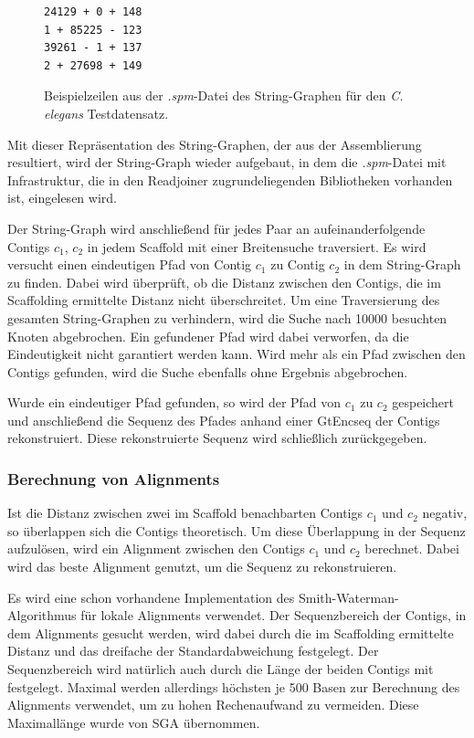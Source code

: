 \documentclass[a4paper,10pt,parskip]{scrartcl}
\begin{document}
\begin{figure}
  \centering
\begin{verbatim}
24129 + 0 + 148
1 + 85225 - 123
39261 - 1 + 137
2 + 27698 + 149
\end{verbatim}
\caption{\label{abb: spm}Beispielzeilen aus der \textit{.spm}-Datei des
  String-Graphen für den \textit{C. elegans} Testdatensatz.}
\end{figure}

Mit dieser Repräsentation des String-Graphen, der aus der
Assemblierung resultiert, wird der String-Graph wieder aufgebaut, in
dem die \textit{.spm}-Datei mit Infrastruktur, die in den Readjoiner
zugrundeliegenden Bibliotheken vorhanden ist, eingelesen wird.

Der String-Graph wird anschließend für jedes Paar an
aufeinanderfolgende Contigs $c_1$, $c_2$ in jedem Scaffold mit einer
Breitensuche traversiert. Es wird versucht einen eindeutigen Pfad von
Contig $c_1$ zu Contig $c_2$ in dem String-Graph zu finden. Dabei wird
überprüft, ob die Distanz zwischen den Contigs, die im Scaffolding
ermittelte Distanz nicht überschreitet. Um eine Traversierung des
gesamten String-Graphen zu verhindern, wird die Suche nach \num{10000}
besuchten Knoten abgebrochen. Ein gefundener Pfad wird dabei
verworfen, da die Eindeutigkeit nicht garantiert werden kann. Wird
mehr als ein Pfad zwischen den Contigs gefunden, wird die Suche
ebenfalls ohne Ergebnis abgebrochen.

Wurde ein eindeutiger Pfad gefunden, so wird der Pfad von $c_1$ zu
$c_2$ gespeichert und anschließend die Sequenz des Pfades anhand einer
GtEncseq der Contigs rekonstruiert. Diese rekonstruierte Sequenz wird
schließlich zurückgegeben.

\subsubsection{Berechnung von Alignments}
Ist die Distanz zwischen zwei im Scaffold benachbarten Contigs $c_1$
und $c_2$ negativ, so überlappen sich die Contigs theoretisch. Um
diese Überlappung in der Sequenz aufzulösen, wird ein Alignment
zwischen den Contigs $c_1$ und $c_2$ berechnet. Dabei wird das beste
Alignment genutzt, um die Sequenz zu rekonstruieren.

Es wird eine schon vorhandene Implementation des
Smith-Waterman-Algorithmus für lokale Alignments  verwendet. Der
Sequenzbereich der Contigs, in dem Alignments gesucht werden, wird
dabei durch die im Scaffolding ermittelte Distanz und das dreifache
der Standardabweichung festgelegt. Der Sequenzbereich wird natürlich
auch durch die Länge der beiden Contigs mit festgelegt. Maximal werden
allerdings höchsten je 500 Basen zur Berechnung des Alignments
verwendet, um zu hohen Rechenaufwand zu vermeiden. Diese Maximallänge
wurde von SGA übernommen.
\end{document}
